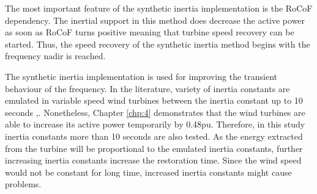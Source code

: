 The most important feature of the synthetic inertia implementation is the RoCoF dependency. The inertial support in this method does decrease the active power as soon as RoCoF turns positive meaning that turbine speed recovery can be started. Thus, the speed recovery of the synthetic inertia method begins with the frequency nadir is reached.\par
The synthetic inertia implementation is used for improving the transient behaviour of the frequency. In the literature, variety of inertia constants are emulated in variable speed wind turbines between the inertia constant up to 10 seconds \cite{Gonzalez-Longatt2013},\cite{Gonzalez-Longatt}. Nonetheless, Chapter \ref{chp:4} demonstrates that the wind turbines are able to increase its active power temporarily by 0.48pu. Therefore, in this study inertia constants more than 10 seconds are also tested. As the energy extracted from the turbine will be proportional to the emulated inertia constants, further increasing inertia constants increase the restoration time. Since the wind speed would not be constant for long time, increased inertia constants might cause problems.\par 
